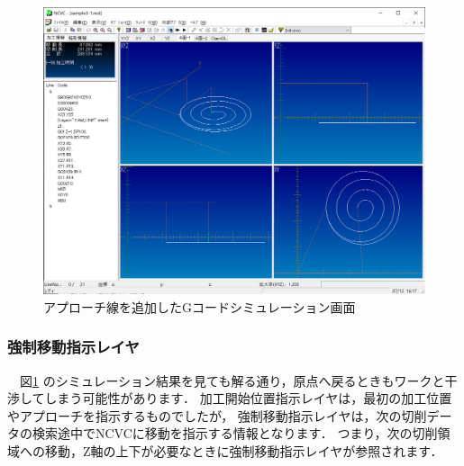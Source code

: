 \begin{figure}[H]
\centering
\includegraphics[scale=0.55]{No3/fig/sample3-1.png}
\caption{アプローチ線を追加したGコードシミュレーション画面}
\label{fig:sample3-1.png}
\end{figure}

\subsubsection{強制移動指示レイヤ}
　図\ref{fig:sample3-1.png} のシミュレーション結果を見ても解る通り，原点へ戻るときもワークと干渉してしまう可能性があります．
加工開始位置指示レイヤは，最初の加工位置やアプローチを指示するものでしたが，
強制移動指示レイヤは，次の切削データの検索途中でNCVCに移動を指示する情報となります．
つまり，次の切削領域への移動，Z軸の上下が必要なときに強制移動指示レイヤが参照されます．


